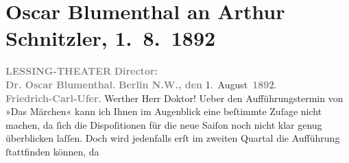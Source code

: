 

         
         \renewcommand{\erwaehntePersonen}{Personen: Eleonora Duse}
         \renewcommand{\erwaehnteInstitutionen}{Institutionen: Lessing-Theater}
         \renewcommand{\erwaehnteOrte}{Orte: Berlin, I., Innere Stadt, Kapelle-Ufer, Wien}
         \renewcommand{\erwaehnteWerke}{Werke: Das Märchen. Schauspiel in drei Aufzügen}
               \section[Oscar Blumenthal an Arthur Schnitzler, 1. 8. 1892]{ Oscar Blumenthal an Arthur Schnitzler, 1. 8. 1892}\nopagebreak{}\rehead{ }\begin{ledgroupsized}[t]{13cm}\normalsize\beginnumbering \toendnotes[C]{\smallbreak\pagebreak[2]} 
\pstart
           \noindent{}\centering{}{\pb}\textcolor{gray}{\textbf{LESSING-THEATER}}\pend
           \pstart
           \noindent{}\centering{}\textcolor{gray}{\textbf{Director:}}{\\}\textcolor{gray}{\textbf{Dr. Oscar Blumenthal.}}\pend
           \pstart
           \noindent{}\raggedleft{}\textcolor{gray}{\textbf{Berlin N.W., den}}{ }1. August \textcolor{gray}{\textbf{189}}2.{\\}\textcolor{gray}{\textbf{Friedrich-Carl-Ufer}}.\pend
           \pstart\center{}Werther Herr Doktor!\pend\pstart
           Ueber den Aufführungstermin von »Das Märchen«
               kann ich Ihnen im Augenblick eine beſtimmte Zuſage nicht machen, da ſich die
               Dispoſitionen für die neue Saiſon noch nicht klar genug überblicken laſſen. Doch wird
               jedenfalls erſt im zweiten Quartal die Aufführung ſtattfinden können, da

\end{ledgroupsized}
